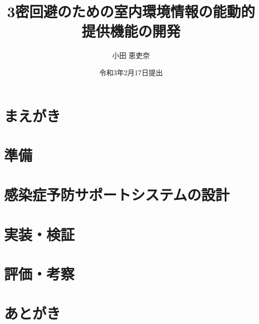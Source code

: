 

\newenvironment{indention}[1]{\par
\addtolength{\leftskip}{#1}
\begingroup}{\endgroup\par}

\title{3密回避のための室内環境情報の能動的提供機能の開発}
\author{小田 恵吏奈}
\date{令和3年2月17日提出}


	\maketitle
	\tableofcontents
	\cleardoublepage
	
	\chapter{まえがき}
	
	
	\chapter{準備}
	
	
	\chapter{感染症予防サポートシステムの設計}
	
	
	
	
	
	
	
	\chapter{実装・検証}
	
	
	
	
	\chapter{評価・考察}
	
	
	
	
	\chapter{あとがき}
	
	
	
	\newpage
